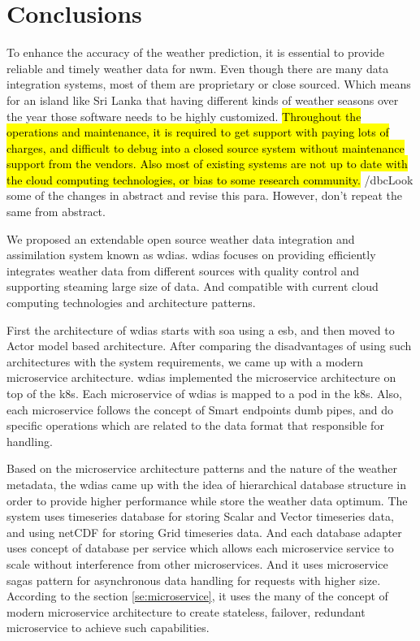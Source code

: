 \section{Conclusions}
\label{se:summary_conclusion}

To enhance the accuracy of the weather prediction, it is essential to provide reliable and timely weather data for \acrshort{nwm}. Even though there are many data integration systems, most of them are proprietary or close sourced. Which means for an island like Sri Lanka that having different kinds of weather seasons over the year those software needs to be highly customized. \hl{Throughout the operations and maintenance, it is required to get support with paying lots of charges, and difficult to debug into a closed source system without maintenance support from the vendors. Also most of existing systems are not up to date with the cloud computing technologies, or bias to some research community.}
/dbc{Look some of the changes in abstract and revise this para. However, don't repeat the same from abstract.}

We proposed an extendable open source weather data integration and assimilation system known as \acrshort{wdias}. \acrshort{wdias} focuses on providing efficiently integrates weather data from different sources with quality control and supporting steaming large size of data. And compatible with current cloud computing technologies and architecture patterns.

First the architecture of \acrshort{wdias} starts with \acrshort{soa} using a \acrfull{esb}, and then moved to Actor model based architecture. After comparing the disadvantages of using such architectures with the system requirements, we came up with a modern microservice architecture.
\acrshort{wdias} implemented the microservice architecture on top of the \acrshort{k8s}. Each microservice of \acrshort{wdias} is mapped to a pod in the \acrshort{k8s}. Also, each microservice follows the concept of Smart endpoints dumb pipes, and do specific operations which are related to the data format that responsible for handling.

Based on the microservice architecture patterns and the nature of the weather metadata, the \acrshort{wdias} came up with the idea of hierarchical database structure in order to provide higher performance while store the weather data optimum. The system uses timeseries database for storing Scalar and Vector timeseries data, and using \acrshort{netCDF} for storing Grid timeseries data. And each database adapter uses concept of database per service which allows each microservice service to scale without interference from other microservices.
And it uses microservice sagas pattern for asynchronous data handling for requests with higher size. According to the section \ref{se:microservice}, it uses the many of the concept of modern microservice architecture to create stateless, failover, redundant microservice to achieve such capabilities.

